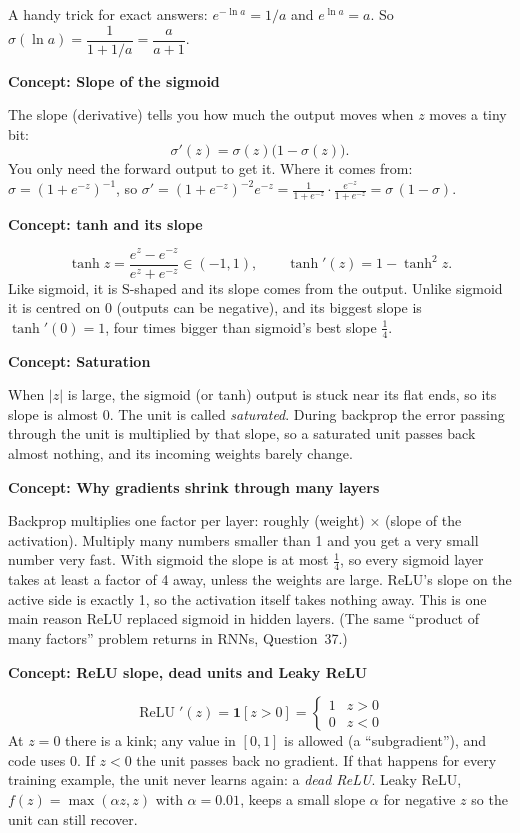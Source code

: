 \documentclass[12pt,a4paper]{article}
\newcommand{\concept}[2]{\par\medskip\phantomsection\label{#1}{\large\bfseries\color{blue!50!black} Concept: #2}\par}
\newcommand{\relu}{\operatorname{ReLU}}
\begin{document}
A handy trick for exact answers: $e^{-\ln a} = 1/a$ and $e^{\ln a}=a$. So $\sigma(\ln a)=\dfrac{1}{1+1/a}=\dfrac{a}{a+1}$.

\concept{c:sigderiv}{Slope of the sigmoid}
The slope (derivative) tells you how much the output moves when $z$ moves a tiny bit:
\[
\sigma'(z)=\sigma(z)\bigl(1-\sigma(z)\bigr).
\]
You only need the forward output to get it. Where it comes from: $\sigma=(1+e^{-z})^{-1}$, so $\sigma' = (1+e^{-z})^{-2}e^{-z} = \frac{1}{1+e^{-z}}\cdot\frac{e^{-z}}{1+e^{-z}} = \sigma\,(1-\sigma)$.

\concept{c:tanh}{tanh and its slope}
\[
\tanh z = \frac{e^z-e^{-z}}{e^z+e^{-z}}\in(-1,1),\qquad \tanh'(z)=1-\tanh^2 z .
\]
Like sigmoid, it is S-shaped and its slope comes from the output. Unlike sigmoid it is centred on 0 (outputs can be negative), and its biggest slope is $\tanh'(0)=1$, four times bigger than sigmoid's best slope $\tfrac14$.

\concept{c:saturation}{Saturation}
When $|z|$ is large, the sigmoid (or tanh) output is stuck near its flat ends, so its slope is almost 0. The unit is called \emph{saturated}. During backprop the error passing through the unit is multiplied by that slope, so a saturated unit passes back almost nothing, and its incoming weights barely change.

\concept{c:vanish}{Why gradients shrink through many layers}
Backprop multiplies one factor per layer: roughly (weight) $\times$ (slope of the activation). Multiply many numbers smaller than 1 and you get a very small number very fast. With sigmoid the slope is at most $\tfrac14$, so every sigmoid layer takes at least a factor of 4 away, unless the weights are large. ReLU's slope on the active side is exactly 1, so the activation itself takes nothing away. This is one main reason ReLU replaced sigmoid in hidden layers. (The same ``product of many factors'' problem returns in RNNs, Question~37.)

\concept{c:reluderiv}{ReLU slope, dead units and Leaky ReLU}
\[
\relu'(z)=\mathbf 1[z>0] = \begin{cases}1 & z>0\\ 0 & z<0\end{cases}
\]
At $z=0$ there is a kink; any value in $[0,1]$ is allowed (a ``subgradient''), and code uses 0. If $z<0$ the unit passes back no gradient. If that happens for every training example, the unit never learns again: a \emph{dead ReLU}. Leaky ReLU, $f(z)=\max(\alpha z,z)$ with $\alpha=0.01$, keeps a small slope $\alpha$ for negative $z$ so the unit can still recover.
\end{document}
